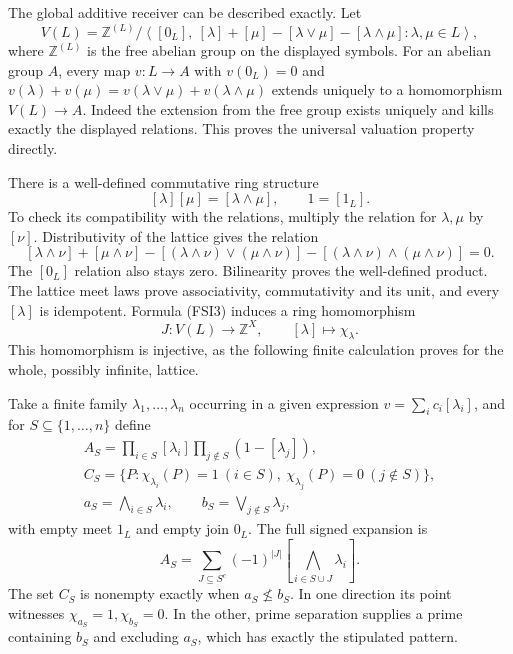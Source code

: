 The global additive receiver can be described exactly. Let
\begin{equation}\tag{FSI5}
V(L)=
\mathbb Z^{(L)}
\Big/
\left\langle
[0_L],\
[\lambda]+[\mu]-[\lambda\vee\mu]-[\lambda\wedge\mu]
:\lambda,\mu\in L
\right\rangle ,
\end{equation}
where \(\mathbb Z^{(L)}\) is the free abelian group on the displayed
symbols. For an abelian group \(A\), every map \(v:L\to A\) with
\(v(0_L)=0\) and
\(v(\lambda)+v(\mu)=v(\lambda\vee\mu)+v(\lambda\wedge\mu)\)
extends uniquely to a homomorphism \(V(L)\to A\).
Indeed the extension from the free group exists uniquely and kills
exactly the displayed relations. This proves the universal
valuation property directly.

There is a well-defined commutative ring structure
\begin{equation}\tag{FSI6}
[\lambda][\mu]=[\lambda\wedge\mu],\qquad 1=[1_L].
\end{equation}
To check its compatibility with the relations, multiply the relation
for \(\lambda,\mu\) by \([\nu]\). Distributivity of the lattice gives
the relation
\[
[\lambda\wedge\nu]+[\mu\wedge\nu]
-[(\lambda\wedge\nu)\vee(\mu\wedge\nu)]
-[(\lambda\wedge\nu)\wedge(\mu\wedge\nu)]=0.
\]
The \([0_L]\) relation also stays zero. Bilinearity proves the
well-defined product. The lattice meet laws prove associativity,
commutativity and its unit, and every \([\lambda]\) is idempotent.
Formula (FSI3) induces a ring homomorphism
\begin{equation}\tag{FSI7}
J:V(L)\longrightarrow\mathbb Z^X,\qquad [\lambda]\longmapsto\chi_\lambda .
\end{equation}
This homomorphism is injective, as the following finite calculation
proves for the whole, possibly infinite, lattice.

Take a finite family \(\lambda_1,\ldots,\lambda_n\) occurring in a
given expression \(v=\sum_i c_i[\lambda_i]\), and for
\(S\subseteq\{1,\ldots,n\}\) define
\begin{equation}\tag{FSI8}
\begin{gathered}
A_S=\prod_{i\in S}[\lambda_i]\prod_{j\notin S}(1-[\lambda_j]),\\
C_S=\{P:\chi_{\lambda_i}(P)=1\ (i\in S),\
\chi_{\lambda_j}(P)=0\ (j\notin S)\},\\
a_S=\bigwedge_{i\in S}\lambda_i,\qquad
b_S=\bigvee_{j\notin S}\lambda_j,
\end{gathered}
\end{equation}
with empty meet \(1_L\) and empty join \(0_L\).
The full signed expansion is
\[
A_S=\sum_{J\subseteq S^c}(-1)^{|J|}
\left[\bigwedge_{i\in S\cup J}\lambda_i\right].
\]
The set \(C_S\) is nonempty exactly when \(a_S\not\le b_S\).
In one direction its point witnesses \(\chi_{a_S}=1,\chi_{b_S}=0\).
In the other, prime separation supplies a prime containing \(b_S\)
and excluding \(a_S\), which has exactly the stipulated pattern.

